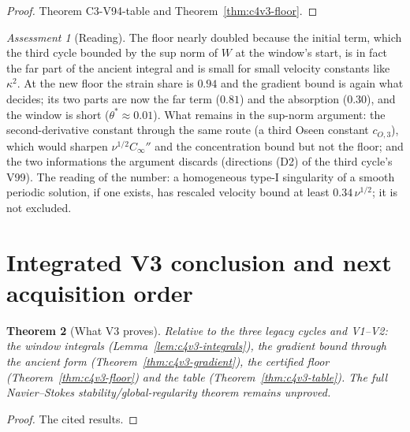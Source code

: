 \documentclass[11pt]{article}
\theoremstyle{plain}
\newtheorem{theorem}{Theorem}[section]
\theoremstyle{definition}
\theoremstyle{remark}
\newtheorem{assessment}[theorem]{Assessment}
\begin{document}
\begin{proof}
Theorem C3-V94-table and Theorem~\ref{thm:c4v3-floor}.
\end{proof}

\begin{assessment}[Reading]
\label{ass:c4v3-reading}
The floor nearly doubled because the initial term, which the third
cycle bounded by the sup norm of \(W\) at the window's start, is in
fact the far part of the ancient integral and is small for small
velocity constants like \(\kappa^2\).  At the new floor the strain share is
\(0.94\) and the gradient bound is again what decides; its two parts are
now the far term (\(0.81\)) and the absorption (\(0.30\)), and the window is
short (\(\theta^*\approx0.01\)).  What remains in the sup-norm argument: the
second-derivative constant through the same route (a third Oseen
constant \(c_{O,3}\)), which would sharpen \(\nu^{1/2}C_\infty''\) and the concentration
bound but not the floor; and the two informations the argument
discards (directions (D2) of the third cycle's V99).  The reading of
the number: a homogeneous type-I singularity of a smooth periodic
solution, if one exists, has rescaled velocity bound at least
\(0.34\,\nu^{1/2}\); it is not excluded.
\end{assessment}

\section{Integrated V3 conclusion and next acquisition order}
\label{sec:c4v3-conclusion}

\begin{theorem}[What V3 proves]
\label{thm:c4v3-conclusion}
Relative to the three legacy cycles and V1--V2: the window integrals
(Lemma~\ref{lem:c4v3-integrals}), the gradient bound through the ancient
form (Theorem~\ref{thm:c4v3-gradient}), the certified floor
(Theorem~\ref{thm:c4v3-floor}) and the table (Theorem~\ref{thm:c4v3-table}).
The full Navier--Stokes stability/global-regularity theorem remains
unproved.
\end{theorem}

\begin{proof}
The cited results.
\end{proof}
\end{document}
